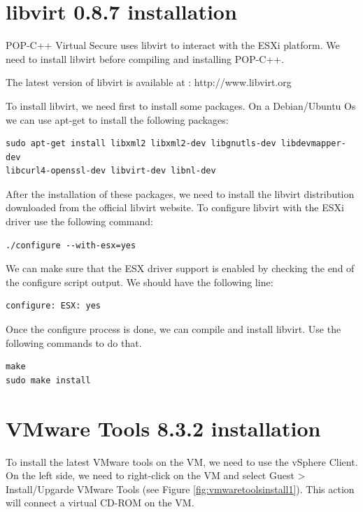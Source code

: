 
\section{libvirt 0.8.7 installation}
\label{app:libvirt}
POP-C++ Virtual Secure uses libvirt to interact with the ESXi platform. We need to install libvirt before compiling and installing POP-C++. \s

The latest version of libvirt is available at : http://www.libvirt.org\s

To install libvirt, we need first to install some packages. On a Debian/Ubuntu Os we can use apt-get to install the following packages: \s

\begin{lstlisting}
sudo apt-get install libxml2 libxml2-dev libgnutls-dev libdevmapper-dev 
libcurl4-openssl-dev libvirt-dev libnl-dev
\end{lstlisting}\s

After the installation of these packages, we need to install the libvirt distribution downloaded from the official libvirt website. To configure libvirt with the ESXi driver use the following command: \s

\begin{lstlisting}
./configure --with-esx=yes
\end{lstlisting}\s

We can make sure that the ESX driver support is enabled by checking the end of the configure script output. We should have the following line:\s

\begin{lstlisting}
configure: ESX: yes
\end{lstlisting}\s

Once the configure process is done, we can compile and install libvirt. Use the following commands to do that. \s

\begin{lstlisting}
make 
sudo make install
\end{lstlisting}



\pagebreak
\section{VMware Tools 8.3.2 installation}
\label{app:vmwaretools}
To install the latest VMware tools on the VM, we need to use the vSphere Client. On the left side, we need to right-click on the VM and select Guest > Install/Upgarde VMware Tools (see Figure \ref{fig:vmwaretoolsinstall1}). This action will connect a virtual CD-ROM on the VM. 

